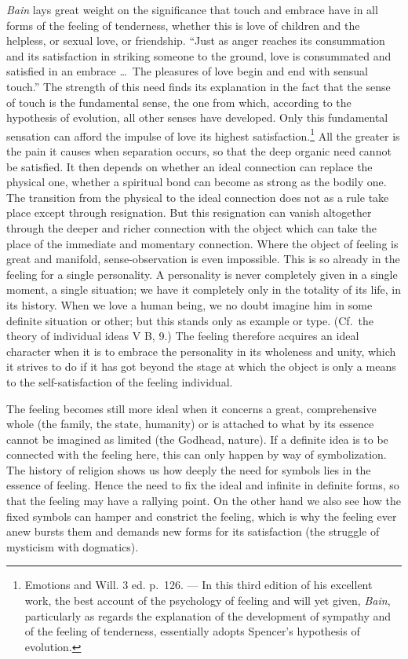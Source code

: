 \documentclass[12pt,a4paper]{book}
\newcommand{\opage}[1]{\marginnote{\footnotesize\textit{[#1]}}}
\begin{document}
\emph{Bain} lays great weight on the significance that touch and embrace
have in all forms of the feeling of tenderness, whether this is love of
children and the helpless, or sexual love, or friendship. ``Just as
anger reaches its consummation and its satisfaction in striking someone
to the ground,
\opage{305}love is consummated and satisfied in an embrace \ldots\ The
pleasures of love begin and end with sensual touch.'' The strength of
this need finds its explanation in the fact that the sense of touch is
the fundamental sense, the one from which, according to the hypothesis
of evolution, all other senses have developed. Only this fundamental
sensation can afford the impulse of love its highest
satisfaction.\footnote{Emotions and Will. 3 ed. p.~126. --- In this
third edition of his excellent work, the best account of the psychology
of feeling and will yet given, \emph{Bain}, particularly as regards the
explanation of the development of sympathy and of the feeling of
tenderness, essentially adopts Spencer's hypothesis of evolution.} All
the greater is the pain it causes when separation occurs, so that the
deep organic need cannot be satisfied. It then depends on whether an
ideal connection can replace the physical one, whether a spiritual bond
can become as strong as the bodily one. The transition from the
physical to the ideal connection does not as a rule take place except
through resignation. But this resignation can vanish altogether through
the deeper and richer connection with the object which can take the
place of the immediate and momentary connection. Where the object of
feeling is great and manifold, sense-observation is even impossible.
This is so already in the feeling for a single personality. A
personality is never completely given in a single moment, a single
situation; we have it completely only in the totality of its life, in
its history. When we love a human being, we no doubt imagine him in some
definite situation or other; but this stands only as example or type.
(Cf.\ the theory of individual ideas V B, 9.) The feeling therefore
acquires an ideal character when it is to embrace the personality in
its wholeness and unity, which it strives to do if it has got beyond the
stage at which the object is only a means to the self-satisfaction of
the feeling individual.

The feeling becomes still more ideal when it concerns a great,
comprehensive whole (the family, the state, humanity) or is attached to
what by its essence cannot be imagined as limited (the Godhead, nature).
If a definite idea is to be connected with the feeling here, this can
only happen by
\opage{306}way of symbolization. The history of religion shows us how
deeply the need for symbols lies in the essence of feeling. Hence the
need to fix the ideal and infinite in definite forms, so that the
feeling may have a rallying point. On the other hand we also see how the
fixed symbols can hamper and constrict the feeling, which is why the
feeling ever anew bursts them and demands new forms for its satisfaction
(the struggle of mysticism with dogmatics).
\end{document}
